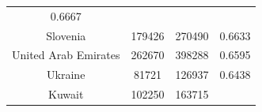 \documentclass[10pt,]{article}
\begin{document}
\begin{longtable}[]{@{}cccc@{}}
\begin{minipage}[t]{0.18\columnwidth}
0.6667\strut
\end{minipage}\tabularnewline
\begin{minipage}[t]{0.26\columnwidth}\centering\strut
Slovenia\strut
\end{minipage} & \begin{minipage}[t]{0.12\columnwidth}\centering\strut
179426\strut
\end{minipage} & \begin{minipage}[t]{0.10\columnwidth}\centering\strut
270490\strut
\end{minipage} & \begin{minipage}[t]{0.18\columnwidth}\centering\strut
0.6633\strut
\end{minipage}\tabularnewline
\begin{minipage}[t]{0.26\columnwidth}\centering\strut
United Arab Emirates\strut
\end{minipage} & \begin{minipage}[t]{0.12\columnwidth}\centering\strut
262670\strut
\end{minipage} & \begin{minipage}[t]{0.10\columnwidth}\centering\strut
398288\strut
\end{minipage} & \begin{minipage}[t]{0.18\columnwidth}\centering\strut
0.6595\strut
\end{minipage}\tabularnewline
\begin{minipage}[t]{0.26\columnwidth}\centering\strut
Ukraine\strut
\end{minipage} & \begin{minipage}[t]{0.12\columnwidth}\centering\strut
81721\strut
\end{minipage} & \begin{minipage}[t]{0.10\columnwidth}\centering\strut
126937\strut
\end{minipage} & \begin{minipage}[t]{0.18\columnwidth}\centering\strut
0.6438\strut
\end{minipage}\tabularnewline
\begin{minipage}[t]{0.26\columnwidth}\centering\strut
Kuwait\strut
\end{minipage} & \begin{minipage}[t]{0.12\columnwidth}\centering\strut
102250\strut
\end{minipage} & \begin{minipage}[t]{0.10\columnwidth}\centering\strut
163715\strut
\end{minipage} & \begin{minipage}[t]{0.18\columnwidth}\centering\strut

\end{minipage}
\end{longtable}
\end{document}
